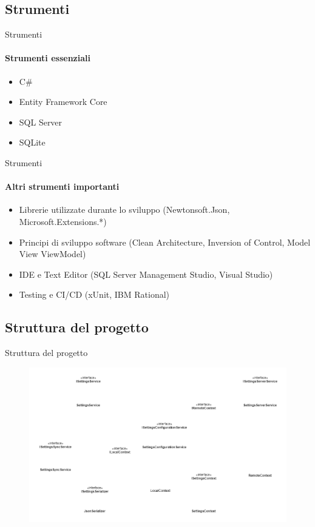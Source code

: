 \documentclass{beamer}
\begin{document}
\begin{darkframes}
    \subsection{Strumenti}
    \begin{frame}{Strumenti}
      \framesubtitle{Strumenti essenziali}
      \begin{itemize}
        \item C\#
        \item Entity Framework Core
        \item SQL Server
        \item SQLite
      \end{itemize}
    \end{frame}

    \begin{frame}{Strumenti}
      \framesubtitle{Altri strumenti importanti}
      \begin{itemize}
        \item Librerie utilizzate durante lo sviluppo (Newtonsoft.Json, Microsoft.Extensions.*)
        \item Principi di sviluppo software (Clean Architecture, Inversion of Control, Model View ViewModel)
        \item IDE e Text Editor (SQL Server Management Studio, Visual Studio)
        \item Testing e CI/CD (xUnit, IBM Rational)
      \end{itemize}
    \end{frame}

    \subsection{Struttura del progetto}
    \begin{frame}{Struttura del progetto}
      \begin{figure}     
        \centering   
        \hspace{-1cm}
        \includegraphics[scale=0.325]{../images/components transparent.png}
      \end{figure}
    \end{frame} 


\end{darkframes}
\end{document}
